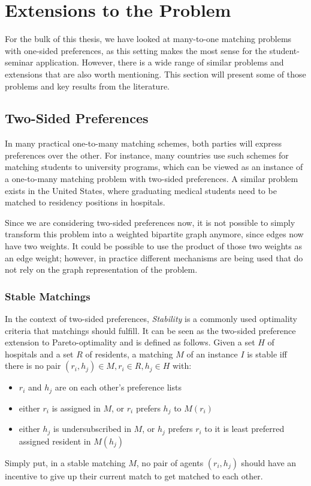 \section{Extensions to the Problem}
For the bulk of this thesis, we have looked at many-to-one matching problems with one-sided preferences, as this setting makes the most sense for the student-seminar application. However, there is a wide range of similar problems and extensions that are also worth mentioning. This section will present some of those problems and key results from the literature. 

\subsection{Two-Sided Preferences}\label{extensions:two-sided}
In many practical one-to-many matching schemes, both parties will express preferences over the other. For instance, many countries use such schemes for matching students to university programs, which can be viewed as an instance of a one-to-many matching problem with two-sided preferences. A similar problem exists in the United States, where graduating medical students need to be matched to residency positions in hospitals. 

Since we are considering two-sided preferences now, it is not possible to simply transform this problem into a weighted bipartite graph anymore, since edges now have two weights. It could be possible to use the product of those two weights as an edge weight; however, in practice different mechanisms are being used that do not rely on the graph representation of the problem.

\subsubsection{Stable Matchings}
In the context of two-sided preferences, \emph{Stability} is a commonly used optimality criteria that matchings should fulfill. It can be seen as the two-sided preference extension to Pareto-optimality and is defined as follows. Given a set $H$ of hospitals and a set $R$ of residents, a matching $M$ of an instance $I$ is stable iff there is no pair $(r_i, h_j) \in M, r_i \in R, h_j \in H$ with:
\begin{itemize}
    \item $r_i$ and $h_j$ are on each other's preference lists
    \item either $r_i$ is assigned in $M$, or $r_i$ prefers $h_j$ to $M(r_i)$
    \item either $h_j$ is undersubscribed in $M$, or $h_j$ prefers $r_i$ to it is least preferred assigned resident in $M(h_j)$
\end{itemize}
Simply put, in a stable matching $M$, no pair of agents $(r_i, h_j)$ should have an incentive to give up their current match to get matched to each other.

